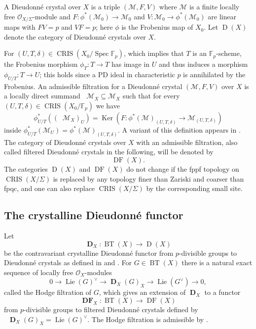 \documentclass[a4paper,11pt]{article}
\theoremstyle{plain}
\theoremstyle{definition}
\theoremstyle{remark}
\theoremstyle{definition}
\numberwithin{Lemma}{section}
\numberwithin{Subpoint}{Lemma}
\numberwithin{equation}{section}
\newcommand{\MMM}{\mathcal{M}}
\newcommand{\OOO}{\mathcal{O}}
\newcommand{\DD}{{\mathbb{D}}}
\newcommand{\FF}{{\mathbb{F}}}
\DeclareMathOperator{\BT}{BT}
\DeclareMathOperator{\Dcat}{D}
\DeclareMathOperator{\Dfun}{\mathbf D} %
\DeclareMathOperator{\DFcat}{DF}
\DeclareMathOperator{\DFfun}{\mathbf{DF}} %
\DeclareMathOperator{\CRIS}{CRIS}
\DeclareMathOperator{\Filone}{Fil^1}
\DeclareMathOperator{\Ker}{Ker}
\DeclareMathOperator{\Lie}{Lie}
\DeclareMathOperator{\Spec}{Spec}
\newcommand{\chang}[1]{{#1}}
\begin{document}
A Dieudonn\'e crystal over $X$ is a triple $(\MMM,F,V)$ 
where $\MMM$ is a finite locally free $\OOO_{X/\Sigma}$-module
and $F:\phi^*(\MMM_0)\to\MMM_0$ and $V:\MMM_0\to\phi^*(\MMM_0)$ 
are linear maps with $FV=p$ and $VF=p$;
here $\phi$ is the Frobenius map of $X_0$.
Let $\Dcat(X)$ denote the category of Dieu\-donn\'e crystals over $X$.

For $(U,T,\delta)\in\CRIS(X_0/\Spec\FF_p)$, 
which implies that $T$ is an $\FF_p$-scheme,
the Frobenius morphism $\phi_T:T\to T$ 
has image in $U$ and thus induces a morphism $\phi_{U/T}:T\to U$;
this holds since a PD ideal in characteristic $p$ 
is annihilated by the Frobenius.
An admissible filtration for a Dieudonn\'e crystal
$(\MMM,F,V)$ over $X$ is a locally direct summand 
$\Filone\MMM_X\subseteq\MMM_X$ such that for \chang{every} 
$(U,T,\delta)\in\CRIS(X_0/\FF_p)$ we have 
\begin{equation}
\label{Eq:adm-fil}
\phi_{U/T}^*((\Filone\MMM_X)_U)=
\Ker(F:\phi^*(\MMM)_{(U,T,\delta)}\to\MMM_{(U,T,\delta)})
\end{equation}
inside $\phi_{U/T}^*(\MMM_U)=\phi^*(\MMM)_{(U,T,\delta)}$.
A variant of this definition appears in \cite[Chap.\ V]{Grothendieck:Montreal}.
The category of Dieudonn\'e crystals 
over $X$ with an admissible filtration,
also called filtered Dieudonn\'e crystals in the following,
will be denoted by
\[
\DFcat(X).
\]
The categories $\Dcat(X)$ and $\DFcat(X)$ do not
change if the fppf topology on $\CRIS(X/\Sigma)$ is replaced by
any topology finer than Zariski and coarser than fpqc, 
and one can also replace $\CRIS(X/\Sigma)$ by the corresponding small site.

\subsection*{The crystalline Dieudonn\'e functor}

Let 
\begin{equation}
\label{Eq:DDX}
\Dfun_X:\BT(X)\to\Dcat(X)
\end{equation}
be the contravariant crystalline Dieudonn\'e functor 
from $p$-divisible groups to Dieudonn\'e crystals 
as defined in \cite{BBM} and \cite{Mazur-Messing}.
For $G\in\BT(X)$ there is a natural exact sequence
of locally free $\OOO_X$-modules
\[
0\to\Lie(G)^\vee\to\Dfun_X(G)_X\to\Lie(G^\vee)\to 0,
\]
called the Hodge filtration of $G$,
which gives an extension of $\Dfun_X$ to a functor
\begin{equation}
\label{Eq:DDFX}
\DFfun_X:\BT(X)\to\DFcat(X)
\end{equation}
from $p$-divisible groups to filtered Dieudonn\'e crystals
defined by $\Filone\Dfun_X(G)_X=\Lie(G)^\vee$.
The Hodge filtration is admissible by \cite[Prop.~4.3.10]{BBM}.
\end{document}
